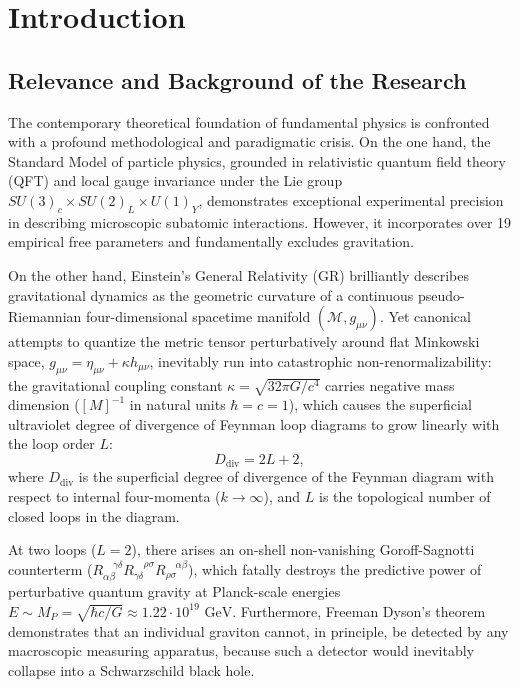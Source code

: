 \documentclass[11pt,a4paper]{article}
\theoremstyle{definition}
\begin{document}
\clearpage

\section*{Introduction}
\label{sec:intro}

\subsection{Relevance and Background of the Research}\label{subsec:relevance}

The contemporary theoretical foundation of fundamental physics is confronted with a profound methodological and paradigmatic crisis. On the one hand, the Standard Model of particle physics, grounded in relativistic quantum field theory (QFT) and local gauge invariance under the Lie group $SU(3)_c \times SU(2)_L \times U(1)_Y$, demonstrates exceptional experimental precision in describing microscopic subatomic interactions. However, it incorporates over 19 empirical free parameters and fundamentally excludes gravitation.

On the other hand, Einstein's General Relativity (GR) brilliantly describes gravitational dynamics as the geometric curvature of a continuous pseudo-Riemannian four-dimensional spacetime manifold $(\mathcal{M}, g_{\mu\nu})$. Yet canonical attempts to quantize the metric tensor perturbatively around flat Minkowski space, $g_{\mu\nu} = \eta_{\mu\nu} + \kappa h_{\mu\nu}$, inevitably run into catastrophic non-renormalizability: the gravitational coupling constant $\kappa = \sqrt{32\pi G/c^4}$ carries negative mass dimension ($[M]^{-1}$ in natural units $\hbar = c = 1$), which causes the superficial ultraviolet degree of divergence of Feynman loop diagrams to grow linearly with the loop order $L$:
\begin{equation}\label{eq:0.3}\tag{0.3}
D_{\text{div}} = 2L + 2,
\end{equation}
where $D_{\text{div}}$ is the superficial degree of divergence of the Feynman diagram with respect to internal four-momenta ($k \to \infty$), and $L$ is the topological number of closed loops in the diagram.

At two loops ($L = 2$), there arises an on-shell non-vanishing Goroff-Sagnotti counterterm ($R_{\alpha\beta}^{\quad\gamma\delta} R_{\gamma\delta}^{\quad\rho\sigma} R_{\rho\sigma}^{\quad\alpha\beta}$), which fatally destroys the predictive power of perturbative quantum gravity at Planck-scale energies $E \sim M_P = \sqrt{\hbar c / G} \approx 1.22 \cdot 10^{19}\text{ GeV}$. Furthermore, Freeman Dyson's theorem demonstrates that an individual graviton cannot, in principle, be detected by any macroscopic measuring apparatus, because such a detector would inevitably collapse into a Schwarzschild black hole.
\end{document}
